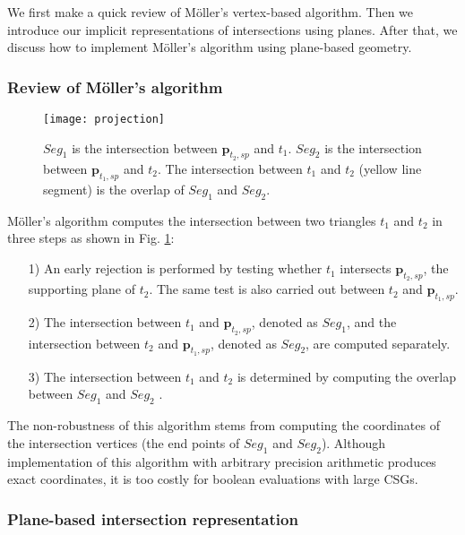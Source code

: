 We first make a quick review of M\"{o}ller's vertex-based algorithm. Then we introduce our implicit representations of intersections using planes. After that, we discuss how to implement M\"{o}ller's algorithm using plane-based geometry.

\subsubsection{Review of M\"{o}ller's algorithm}


\begin{figure}[t]
\centering
\texttt{[image: projection]}
\caption{$Seg_1$ is the intersection between $\bm{p}_{t_2, sp}$ and $t_1$. $Seg_2$ is the intersection between $\bm{p}_{t_1, sp}$ and $t_2$. The intersection between $t_1$ and $t_2$ (yellow line segment) is the overlap of $Seg_1$ and $Seg_2$.}
\label{fig_projection}
\end{figure}


M\"{o}ller's algorithm computes the intersection between two triangles $t_1$ and $t_2$ in three steps as shown in Fig. \ref{fig_projection}:
\begin{itemize}[leftmargin=0.45cm]
\item[1)] An early rejection is performed by testing whether $t_1$ intersects $\bm{p}_{t_2, sp}$, the supporting plane of $t_2$. The same test is also carried out between $t_2$ and $\bm{p}_{t_1, sp}$.
\item[2)]The intersection between $t_1$ and $\bm{p}_{t_2, sp}$, denoted as $Seg_1$, and the intersection between $t_2$ and $\bm{p}_{t_1, sp}$, denoted as $Seg_2$, are computed separately.
 \item[3)]The intersection between $t_1$ and $t_2$ is determined by computing the overlap between $Seg_1$ and $Seg_2$ .
\end{itemize}



The non-robustness of this algorithm stems from computing the coordinates of the intersection vertices (the end points of $Seg_1$ and $Seg_2$). Although implementation of this algorithm with arbitrary precision arithmetic produces exact coordinates, it is too costly for boolean evaluations with large CSGs.

\subsubsection{Plane-based intersection representation}
\label{sec:ir}

